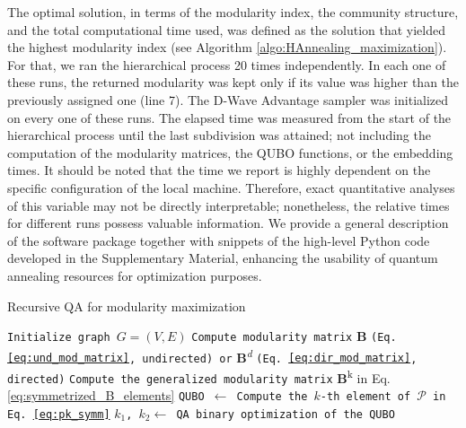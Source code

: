 \documentclass[pdflatex,sn-mathphys-num]{sn-jnl}%
\begin{document}
The optimal solution, in terms of the modularity index, the community structure, and the total computational time used, was defined as the solution that yielded the highest modularity index (see Algorithm \ref{algo:HAnnealing_maximization}). For that, we ran the hierarchical process 20 times independently. In each one of these runs, the returned modularity was kept only if its value was higher than the previously assigned one (line 7). The D-Wave Advantage sampler was initialized on every one of these runs. The elapsed time was measured from the start of the hierarchical process until the last subdivision was attained; not including the computation of the modularity matrices, the QUBO functions, or the embedding times. It should be noted that the time we report is highly dependent on the specific configuration of the local machine. Therefore, exact quantitative analyses of this variable may not be directly interpretable; nonetheless, the relative times for different runs possess valuable information. We provide a general description of the software package together with snippets of the high-level Python code developed in the Supplementary Material, enhancing the usability of quantum annealing resources for optimization purposes.

\begin{algorithm}
    \caption{Recursive QA for modularity maximization}
    \label{algo:HAnnealing}
    \begin{algorithmic}[1]
        \State \texttt{Initialize graph $G=(V,E)$}      
            \State \texttt{Compute modularity matrix} \textbf{B} \texttt{(Eq. \ref{eq:und_mod_matrix}, undirected) or} \textbf{B}\textsuperscript{\textit{d}} \texttt{(Eq. \ref{eq:dir_mod_matrix}, directed)}
            \State \texttt{Compute the generalized modularity matrix} \textbf{B}\textsuperscript{k} in Eq. \ref{eq:symmetrized_B_elements}
            \State \texttt{QUBO $\leftarrow$ Compute the $k$-th element of $\mathcal{P}$ in Eq. \ref{eq:pk_symm}}
            \State \texttt{$k_1$, $k_2 \leftarrow$ QA binary optimization of the QUBO}
                \State {}
                \State {}
                \State {}
            \Else
                \State {}
            \EndIf
        \EndProcedure
    \end{algorithmic} 
\end{algorithm} 
\end{document}
